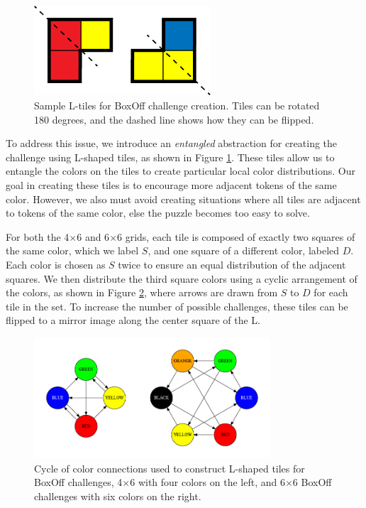 \documentclass[journal]{IEEEtran}
\begin{document}
\begin{figure}[t]
\centering
\includegraphics[width=6.6cm]{boxoffltiles.png}
\caption{Sample L-tiles for BoxOff challenge creation. Tiles can be rotated 180 degrees, and the dashed line shows how they can be flipped. }
\label{fig:ltiles}
\end{figure}


To address this issue, we introduce an {\it entangled} abstraction for creating the challenge using L-shaped tiles, as shown in Figure \ref{fig:ltiles}. These tiles allow us to entangle the colors on the tiles to create particular local color distributions.
Our goal in creating these tiles is to encourage more adjacent tokens of the same color. However, we also must avoid creating situations where all tiles are adjacent to tokens of the same color, else the puzzle becomes too easy to solve. 

For both the 4$\times$6 and 6$\times$6 grids, each tile is composed of exactly two squares of the same color, which we label $S$, and one square of a different color, labeled $D$. Each color is chosen as $S$ twice to ensure an equal distribution of the adjacent squares. We then distribute the third square colors using a cyclic arrangement of the colors, as shown in Figure \ref{fig:boxoffcycle}, where arrows are drawn from $S$ to $D$ for each tile in the set.  To increase the number of possible challenges, these tiles can be flipped to a mirror image along the center square of the L.

\begin{figure}[t]
\centering
\includegraphics[width=8.8cm]{boxoffcycle.png}
\caption{Cycle of color connections used to construct L-shaped tiles for BoxOff challenges, 4$\times$6 with four colors on the left, and 6$\times$6 BoxOff challenges with six colors on the right.}
\label{fig:boxoffcycle}
\end{figure}
\end{document}
